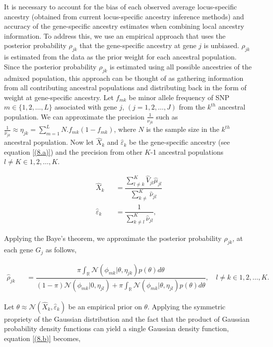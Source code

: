 \documentclass[10pt]{article}
\begin{document}
It is necessary to account for the bias of each observed average locus-specific ancestry (obtained from current locus-specific ancestry inference methods) and accuracy of the gene-specific ancestry estimates when combining local ancestry information. To address this, we use an empirical approach that uses the posterior probability $\rho_{jk}$ that the gene-specific ancestry at gene $j$ is unbiased. $\rho_{jk}$ is estimated from the data as the prior weight for each ancestral population. Since the posterior probability $\rho_{jk}$ is estimated using all possible ancestries of the admixed population, this approach can be thought of as gathering information from all contributing ancestral populations and distributing back in the form of weight at gene-specific ancestry. Let $f_{mk}$ be minor allele frequency of SNP $m \in \lbrace 1,2,\ldots,L \rbrace$ associated with gene $j$, $\left(j= 1,2,\ldots,J \right)$ from the $k^{th}$ ancestral population. We can approximate the precision $\frac{1}{\hat \nu_{jk}}$ such as 
$\frac{1}{\hat \nu_{jk}} \approx \mathbb{\eta}_{jk} = \sum^{L}_{m=1}N.f_{mk}\left(1-f_{mk}\right)$, where $N$ is the sample size in the $k^{th}$ ancestral population. Now let $\hat X_{k}$ and $\hat \varepsilon_{k}$ be the gene-specific ancestry (see equation \ref{(8.a)}) and the precision from other $K$-1 ancestral populations $l \neq K \in {1,2, \ldots,K}$. 

\setlength\arraycolsep{2pt}
\begin{eqnarray}
\hat X_{k} && = \dfrac{\sum^{K}_{l\neq k} \hat V_{jl} \hat \mu_{jl} }{\sum^{K}_{k\neq } \hat \nu_{jl} } \label{(8.b1)} \nonumber \\[2pt]
\hat \varepsilon_{k} && = \dfrac{1}{\sum^{K}_{k\neq l} \hat \nu_{jl}}, \nonumber
\end{eqnarray}

Applying the Baye’s theorem, we approximate the posterior probability $\rho_{jk}$, at each gene $G_j$ as follows,

\setlength\arraycolsep{2pt}
\begin{eqnarray}
\hat \rho_{jk} &&= \dfrac{\pi\int_{\mathbb{R}} \mathcal{N}(\phi_{mk}\vert \theta,\mathbb{\eta}_{jk}) p(\theta) d \theta  } {(1-\pi)\mathcal{N}(\phi_{mk}\vert 0,\mathbb{\eta}_{jl})+\pi\int_{\mathbb{R}}\mathcal{N}(\phi_{mk}\vert \theta,\mathbb{\eta}_{jl}) p(\theta) d \theta },\quad l \neq k \in {1,2,\ldots,K}.  \label{(8.b)}
\end{eqnarray}

Let $ \theta \approx \mathcal{N}(\hat X_{k},\hat \varepsilon_{k})$ be an empirical prior on $\theta$. Applying the symmetric propriety of the Gaussian distribution and the fact that the product of Gaussian probability density functions can yield a single Gaussian density function, equation \ref{(8.b)} becomes,
\end{document}
